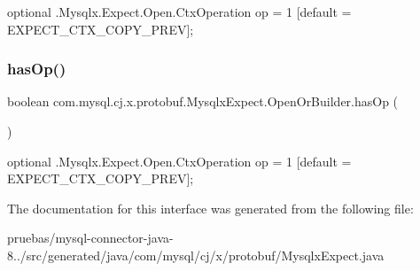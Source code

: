 {\ttfamily optional .Mysqlx.\+Expect.\+Open.\+Ctx\+Operation op = 1 \mbox{[}default = E\+X\+P\+E\+C\+T\+\_\+\+C\+T\+X\+\_\+\+C\+O\+P\+Y\+\_\+\+P\+R\+EV\mbox{]};} \mbox{\label{interfacecom_1_1mysql_1_1cj_1_1x_1_1protobuf_1_1_mysqlx_expect_1_1_open_or_builder_a173f6467d5e57ac44c7606a9895c3fe1}} 
\subsubsection{\texorpdfstring{has\+Op()}{hasOp()}}
{\footnotesize\ttfamily boolean com.\+mysql.\+cj.\+x.\+protobuf.\+Mysqlx\+Expect.\+Open\+Or\+Builder.\+has\+Op (\begin{DoxyParamCaption}{ }\end{DoxyParamCaption})}

{\ttfamily optional .Mysqlx.\+Expect.\+Open.\+Ctx\+Operation op = 1 \mbox{[}default = E\+X\+P\+E\+C\+T\+\_\+\+C\+T\+X\+\_\+\+C\+O\+P\+Y\+\_\+\+P\+R\+EV\mbox{]};} 

The documentation for this interface was generated from the following file\+:\begin{DoxyCompactItemize}
\item 
pruebas/mysql-\/connector-\/java-\/8../src/generated/java/com/mysql/cj/x/protobuf/Mysqlx\+Expect.\+java\end{DoxyCompactItemize}
